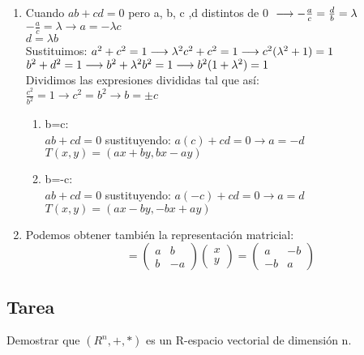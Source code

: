 \documentclass{book}
\begin{document}
\begin{enumerate}
\begin{enumerate}
    \end{enumerate}
    \item Cuando $ab+cd=0$ pero a, b, c ,d distintos de 0
    $\\ \longrightarrow-\frac{a}{c}=\frac{d}{b}=\lambda$
    \\$-\frac{a}{c}=\lambda\longrightarrow a=-\lambda c$
    \\$d=\lambda b$
    \\ Sustituimos:
    $\\a^2+c^2=1\longrightarrow \lambda^2c^2+c^2=1\longrightarrow c^2(\lambda^2+1)=1$
    $\\b^2+d^2=1\longrightarrow b^2+\lambda^2b^2=1\longrightarrow b^2(1+\lambda^2)=1$
    \\Dividimos las expresiones divididas tal que así:
    \\$\frac{c^2}{b^2}=1\longrightarrow c^2=b^2\longrightarrow b=\pm c$
    \begin{enumerate}
        \item b=c:
        \\$ab+cd=0$ sustituyendo: $a(c)+cd=0 \longrightarrow a=-d $
        \\$T(x,y)=(ax+by,bx-ay)$
        \item b=-c:
        \\$ab+cd=0$ sustituyendo: $a(-c)+cd=0 \longrightarrow a=d $
        \\$T(x,y)=(ax-by,-bx+ay)$
    \end{enumerate}
    \item Podemos obtener también la representación matricial:
    \\
    \begin{equation}
      [T]=
        \begin{pmatrix}
            a & b\\
            b & -a
        \end{pmatrix}
        \begin{pmatrix}
            x\\
            y
        \end{pmatrix}
        =
        \begin{pmatrix}
            a & -b\\
            -b & a
        \end{pmatrix}
    \end{equation}
\end{enumerate}
\newpage
\subsection{Tarea}
Demostrar que $(R^n,+,*)$ es un R-espacio vectorial de dimensión n.
\end{document}
